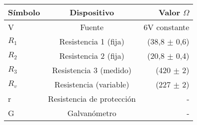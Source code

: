 \begin{tabular}{|l|c|r|}
\hline
Símbolo &Dispositivo &Valor $\Omega$ \\ \hline
V &Fuente & 6V constante \\
$R_1$ &Resistencia 1 (fija) &(38,8 $\pm$ 0,6) \\
$R_2$ &Resistencia 2 (fija) &(20,8 $\pm$ 0,4) \\
$R_3$ &Resistencia 3 (medido) &(420 $\pm$ 2) \\
$R_v$ &Resistencia (variable) &(227 $\pm$ 2) \\
r &Resistencia de protección &- \\
G &Galvanómetro &- \\ \hline
\end{tabular}
